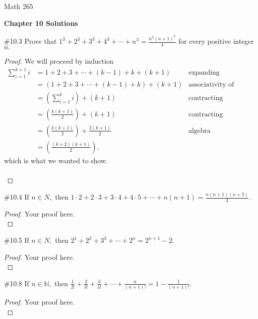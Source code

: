 \documentclass[11pt]{report}
\theoremstyle{plain}
\newcommand{\N}{\mathbb{N}}
\begin{document}
\hfill Math 265

\begin{center}
\Large{\textbf{Chapter 10 Solutions }} \\
\end{center}

\begin{description}
\item{\#10.3} Prove that $1^3+2^3+3^3+4^3 + \cdots +n^3=\frac{n^2(n+1)^2}{4}$ for every positive integer $n.$ \\
\begin{proof} We will proceed by induction
\begin{align*}
\sum_{i=1}^{k+1} i  &= 1+2+3+ \cdots + (k-1)+k+(k+1) &\text{expanding summation notation} \\
 &=(1+2+3+ \cdots + (k-1)+k)+(k+1) &\text{associativity of addition} \\
 &=\left(\sum_{i=1}^{k} i \right)+(k+1) &\text{contracting summation notation} \\
  &=\left(\frac{k(k+1)}{2}\right)+(k+1) &\text{contracting summation notation} \\
  &=\left(\frac{k(k+1)}{2}\right)+\frac{2(k+1)}{2} &\text{algebra} \\
   &=\left(\frac{(k+2)(k+1)}{2}\right),&
  \end{align*}
  which is what we wanted to show.\\ \\
\end{proof}

\item{\#10.4} If $n \in N,$ then $1\cdot 2+2 \cdot 3 + 3 \cdot 4 + 4 \cdot 5 + \cdots + n(n+1)=\frac{n(n+1)(n+2)}{3}$. \\
\begin{proof}  Your proof here. \\

\end{proof}

\item{\#10.5} If $n \in N,$ then $2^1+2^2+3^3+\cdots+2^n=2^{n+1}-2$.\\
\begin{proof} Your proof here. \\

\end{proof}

\item{\#10.8} If $n \in \N,$ then $\frac{1}{2!}+\frac{2}{3!}+\frac{3}{4!}+\cdots+\frac{n}{(n+1)!}=1-\frac{1}{(n+1)!}.$\\
\begin{proof}  Your proof here. \\


\end{proof}
\end{description}
\end{document}
